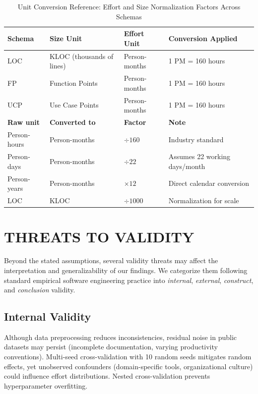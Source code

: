 \documentclass[11pt,a4paper]{article}
\begin{document}
\begin{table}[h]
\centering
\caption{Unit Conversion Reference: Effort and Size Normalization Factors Across Schemas}
\label{tab:unit-conversion}
\begin{tabular}{|l|l|l|l|}
\hline
\textbf{Schema} & \textbf{Size Unit} & \textbf{Effort Unit} & \textbf{Conversion Applied} \\
\hline
LOC & KLOC (thousands of lines) & Person-months & 1 PM = 160 hours \\
FP & Function Points & Person-months & 1 PM = 160 hours \\
UCP & Use Case Points & Person-months & 1 PM = 160 hours \\
\hline
\textbf{Raw unit} & \textbf{Converted to} & \textbf{Factor} & \textbf{Note} \\
\hline
Person-hours & Person-months & $\div 160$ & Industry standard \\
Person-days & Person-months & $\div 22$ & Assumes 22 working days/month \\
Person-years & Person-months & $\times 12$ & Direct calendar conversion \\
LOC & KLOC & $\div 1000$ & Normalization for scale \\
\hline
\end{tabular}
\end{table}

\newpage

\section{THREATS TO VALIDITY}

Beyond the stated assumptions, several validity threats may affect the interpretation and generalizability of our findings. We categorize them following standard empirical software engineering practice into \textit{internal}, \textit{external}, \textit{construct}, and \textit{conclusion} validity.

\subsection{Internal Validity}
Although data preprocessing reduces inconsistencies, residual noise in public datasets may persist (incomplete documentation, varying productivity conventions). Multi-seed cross-validation with 10 random seeds mitigates random effects, yet unobserved confounders (domain-specific tools, organizational culture) could influence effort distributions. Nested cross-validation prevents hyperparameter overfitting.
\end{document}
